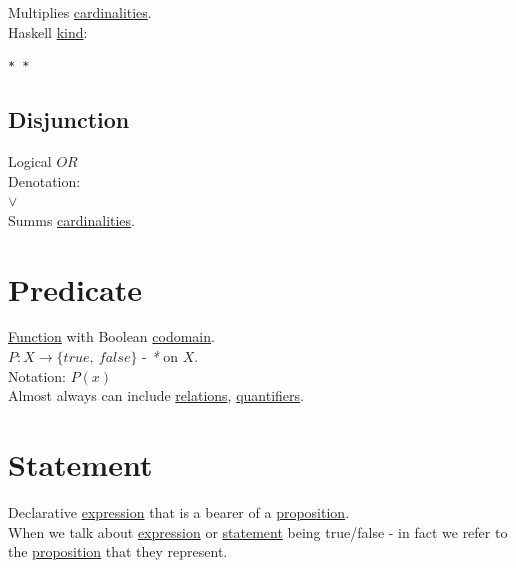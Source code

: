 \documentclass[a4paper,14pt,oneside]{book}
\begin{document}
Multiplies \hyperref[org73ae378]{cardinalities}.\\

Haskell \hyperref[org4c84b44]{kind}:\\
\begin{verbatim}
* *
\end{verbatim}

\subsection{\label{org41cdd0c}Disjunction}
\label{sec:orgfcb77fd}
Logical \(OR\)\\
Denotation:\\
\(\lor\)\\

Summs \hyperref[org73ae378]{cardinalities}.\\

\section{\label{orgff4f831}Predicate}
\label{sec:org3aaf8c4}
\hyperref[org9530a6b]{Function} with Boolean \hyperref[orgaa1c608]{codomain}.\\
\(P: X \to \{ true, \ false \}\) - \emph{*} on \(X\).\\

Notation: \(P(x)\)\\

Almost always can include \hyperref[org2049f4a]{relations}, \hyperref[org16b2a1a]{quantifiers}.\\

\section{\label{orgef7434f}Statement}
\label{sec:orgcba6409}
Declarative \hyperref[orgade06d7]{expression} that is a bearer of a \hyperref[orgc2d9f74]{proposition}.\\

When we talk about \hyperref[orgade06d7]{expression} or \hyperref[orgef7434f]{statement} being true/false - in fact we refer to the \hyperref[orgc2d9f74]{proposition} that they represent.\\
\end{document}
